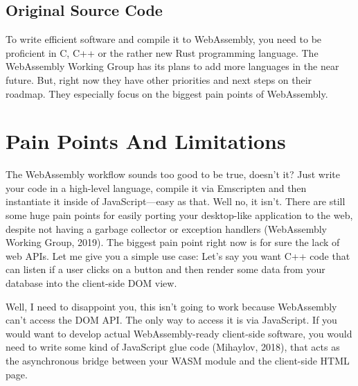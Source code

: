 \documentclass[10pt]{article}  %
\begin{document}
\begin{sloppypar}
  \subsection{Original Source Code}
  \label{sec:original-source-code}

  To write efficient software and compile it to WebAssembly, you need to be proficient in C, C++ or the rather new Rust programming language. The WebAssembly Working Group has its plans to add more languages in the near future. But, right now they have other priorities and next steps on their roadmap. They especially focus on the biggest pain points of WebAssembly.

  \section{Pain Points And Limitations}
  \label{sec:pain-points-and-limitations}

  The WebAssembly workflow sounds too good to be true, doesn’t it? Just write your code in a high-level language, compile it via Emscripten and then instantiate it inside of JavaScript—easy as that. Well no, it isn’t. There are still some huge pain points for easily porting your desktop-like application to the web, despite not having a garbage collector or exception handlers (WebAssembly Working Group, 2019). The biggest pain point right now is for sure the lack of web APIs. Let me give you a simple use case: Let’s say you want C++ code that can listen if a user clicks on a button and then render some data from your database into the client-side DOM view.

  Well, I need to disappoint you, this isn’t going to work because WebAssembly can’t access the DOM API. The only way to access it is via JavaScript. If you would want to develop actual WebAssembly-ready client-side software, you would need to write some kind of JavaScript glue code (Mihaylov, 2018), that acts as the asynchronous bridge between your WASM module and the client-side HTML page.

  \pagebreak
  
  

\end{sloppypar}
\end{document}
